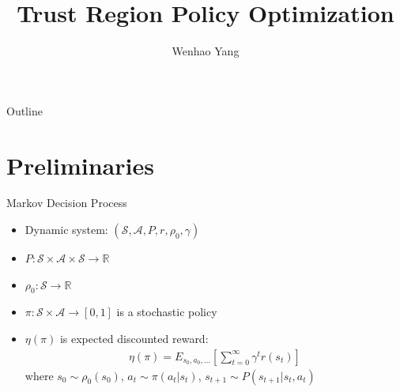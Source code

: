 \documentclass[mathserif]{beamer}
\begin{document}
\title{Trust Region Policy Optimization}

\author{Wenhao Yang
}
\begin{frame}
  \titlepage
\end{frame}

\date{}

\begin{frame}{Outline}
\tableofcontents
\end{frame}

\section{Preliminaries}
\begin{frame}[t]{Markov Decision Process}
\begin{itemize}
  \item Dynamic system: $(\mathcal{S},\mathcal{A},P,r,\rho_{0},\gamma)$
  \item $P:\mathcal{S}\times\mathcal{A}\times\mathcal{S}\rightarrow\mathbb{R}$
  \item $\rho_{0}:\mathcal{S}\rightarrow\mathbb{R}$
  \item $\pi:\mathcal{S}\times\mathcal{A}\rightarrow[0,1]$ is a stochastic policy
  \item $\eta(\pi)$ is expected discounted reward:
  \begin{align}
    \eta(\pi)=E_{s_{0},a_{0},...}[\sum_{t=0}^{\infty}\gamma^{t}r(s_{t})]
  \end{align}
  where $s_{0}\sim\rho_{0}(s_{0})$, $a_{t}\sim\pi(a_{t}|s_{t})$, $s_{t+1}\sim P(s_{t+1}|s_{t},a_{t})$
\end{itemize}
\end{frame}
\end{document}
